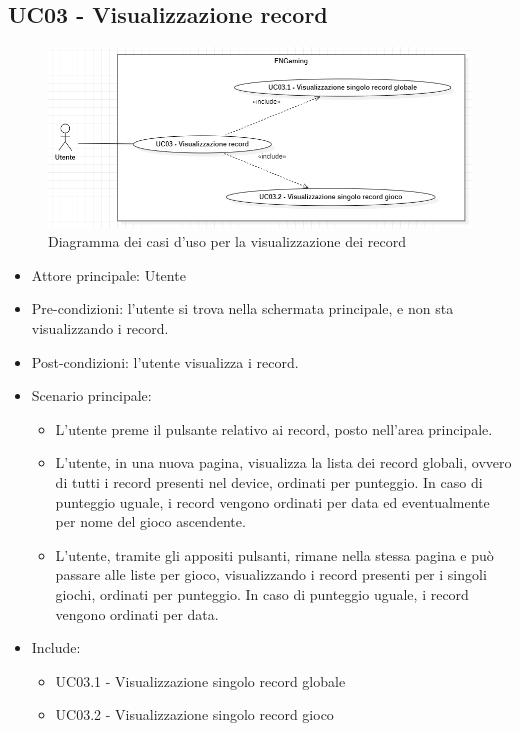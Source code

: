 \subsection{UC03 - Visualizzazione record}
\begin{figure}[h]
    \centering
    \includegraphics[width=400pt]{images/usecase/UC03.png}
    \caption{Diagramma dei casi d'uso per la visualizzazione dei record}
    \label{fig:UC03}
\end{figure}
\begin{itemize}
    \item Attore principale: Utente
    \item Pre-condizioni: l'utente si trova nella schermata principale, e non sta visualizzando i record.
    \item Post-condizioni: l'utente visualizza i record.
    \item Scenario principale: \begin{itemize}
        \item L'utente preme il pulsante relativo ai record, posto nell'area principale.
        \item L'utente, in una nuova pagina, visualizza la lista dei record globali, ovvero di tutti i record presenti nel device, ordinati per punteggio. In caso di punteggio uguale, i record vengono ordinati per data ed eventualmente per nome del gioco ascendente.
        \item L'utente, tramite gli appositi pulsanti, rimane nella stessa pagina e può passare alle liste per gioco, visualizzando i record presenti per i singoli giochi, ordinati per punteggio. In caso di punteggio uguale, i record vengono ordinati per data.
    \end{itemize}
    \item Include: \begin{itemize}
        \item UC03.1 - Visualizzazione singolo record globale
        \item UC03.2 - Visualizzazione singolo record gioco
    \end{itemize}
\end{itemize}

